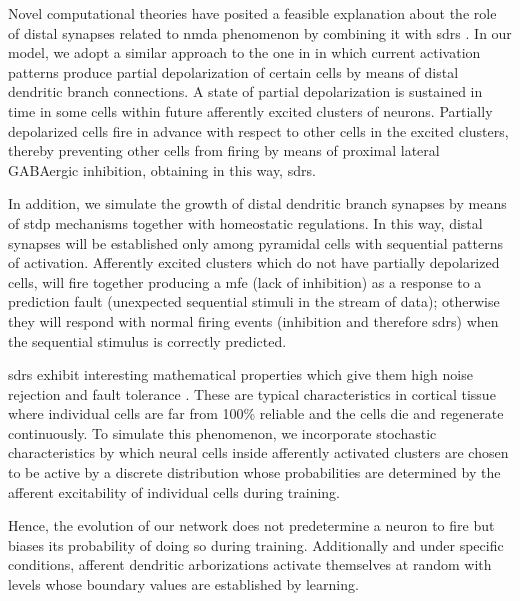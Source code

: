 \documentclass[10pt,letterpaper]{article}
\begin{document}
Novel computational theories have posited a feasible explanation about the role of distal synapses related to \gls{nmda}
phenomenon \cite{hawkins_2016} by combining it with \glspl{sdr} \cite{ahmad_2016}. In our model, we adopt a similar approach to the one in \cite{hawkins_2016} in which current activation patterns produce partial depolarization of certain cells by means of distal dendritic branch connections. A state of partial depolarization is sustained in time in some cells within
future afferently excited clusters of neurons. Partially depolarized cells fire in advance with respect to other cells in the excited clusters, thereby preventing other cells from firing by means of proximal lateral GABAergic inhibition, obtaining in this way, \glspl{sdr}.

In addition, we simulate the growth of distal dendritic branch synapses by means of \gls{stdp} mechanisms together with
homeostatic regulations. In this way, distal synapses will be established only among pyramidal cells with sequential patterns
of activation. Afferently excited clusters which do not have partially depolarized cells,
will fire together producing a \gls{mfe}
(lack of inhibition) as a response to a prediction fault (unexpected sequential stimuli in the stream of data); otherwise they will respond with normal firing events (inhibition and therefore \glspl{sdr}) when the sequential stimulus is
correctly predicted.

\glspl{sdr} exhibit interesting mathematical properties which give them high noise rejection and fault tolerance \cite{ahmad_2015}.
These are typical characteristics in cortical tissue where individual cells are far from 100\% reliable and the cells die and regenerate continuously. To simulate this phenomenon, we incorporate stochastic characteristics by which neural cells inside afferently activated clusters are chosen to be active by a discrete distribution whose probabilities are determined by the afferent excitability of individual cells during training.

Hence, the evolution of our network does not predetermine a neuron to fire but biases its probability of doing so during training. Additionally and under specific conditions, afferent dendritic arborizations activate themselves at random with levels whose boundary values are established by learning. 
\end{document}
